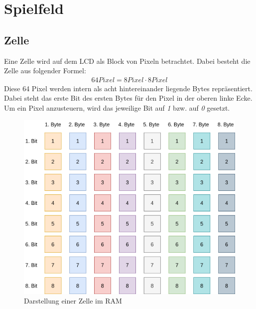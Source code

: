 \section{Spielfeld}

    \subsection{Zelle}
        Eine Zelle wird auf dem LCD als Block von Pixeln betrachtet.
        Dabei besteht die Zelle aus folgender Formel:
        \begin{align}
        64 Pixel = 8 Pixel \cdot 8 Pixel
        \end{align}
        Diese 64 Pixel werden intern als acht hintereinander liegende Bytes repräsentiert.
        Dabei steht das erste Bit des ersten Bytes für den Pixel in der oberen linke Ecke.
        Um ein Pixel anzusteuern, wird das jeweilige Bit auf \textit{1} bzw. auf \textit{0} gesetzt.
        \begin{figure}[H]
            \centering
            \includegraphics[scale=0.25]{img/zelle.png}    
            \caption{Darstellung einer Zelle im RAM}
        \end{figure}
    
